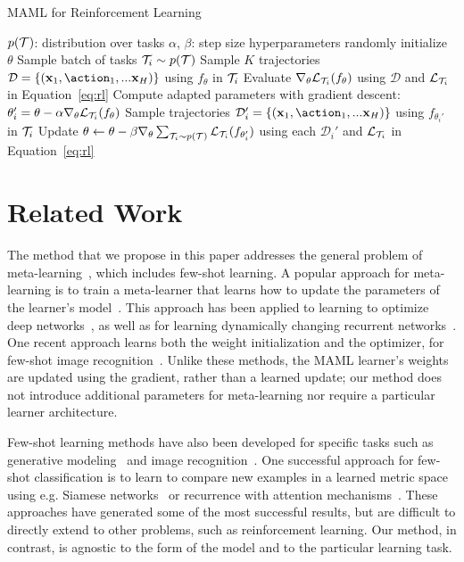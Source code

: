 \documentclass{article}
\begin{document}
\begin{algorithm}[t]
\caption{MAML for Reinforcement Learning}
\label{alg:mamlrl}
\begin{algorithmic}[1]
{\footnotesize
\REQUIRE $p(\mathcal{T})$: distribution over tasks
\REQUIRE $\alpha$, $\beta$: step size hyperparameters
\STATE randomly initialize $\theta$
\STATE Sample batch of tasks $\mathcal{T}_i \sim p(\mathcal{T})$
      \STATE Sample $K$ trajectories $\mathcal{D}=\{(\inp_1,\action_1,...\inp_H)\}$ using $f_\theta$ in $\mathcal{T}_i$
      \STATE Evaluate $\nabla_\theta \mathcal{L}_{\mathcal{T}_i}(f_\theta)$ using $\mathcal{D}$ and $\mathcal{L}_{\mathcal{T}_i}$ in Equation~\ref{eq:rl}
      \STATE Compute adapted parameters with gradient descent: $\theta_i'=\theta-\alpha \nabla_\theta  \mathcal{L}_{\mathcal{T}_i}(  f_\theta )$
      \STATE Sample trajectories $\mathcal{D}_i'=\{(\inp_1,\action_1,...\inp_H)\}$ using $f_{\theta_i'}$ in $\mathcal{T}_i$ 
 \ENDFOR
 \STATE Update $\theta \leftarrow \theta - \beta \nabla_\theta \sum_{\mathcal{T}_i \sim p(\mathcal{T})}  \mathcal{L}_{\mathcal{T}_i} ( f_{\theta_i'})$ using each $\mathcal{D}_i'$ and $\mathcal{L}_{\mathcal{T}_i}$ in Equation~\ref{eq:rl}
\ENDWHILE
}
\end{algorithmic}
\end{algorithm}


\section{Related Work}

The method that we propose in this paper addresses the general problem of meta-learning~\cite{thrun,schmidhuber1987,naik}, which includes few-shot learning.
A popular approach for meta-learning is to train a meta-learner that learns how to update the parameters of the learner's model~\cite{bengiobengio1,schmidfastweights,bengiobengio2}. This approach has been applied to learning to optimize deep networks~\cite{hochreiter,learntolearnbygdbygd,learntooptimize}, as well as for learning dynamically changing recurrent networks~\cite{hypernets}. 
One recent approach learns both the weight initialization and the optimizer, for few-shot image recognition~\cite{hugo}. Unlike these methods, the MAML learner's weights are updated using the gradient, rather than a learned update; our method does not introduce additional parameters for meta-learning nor require a particular learner architecture.

Few-shot learning methods have also been developed for specific tasks such as generative modeling~\cite{neuralstatistician,oneshotgenicml} and image recognition~\cite{matchingnets}. One successful approach for few-shot classification is to learn to compare new examples in a learned metric space using e.g. Siamese networks~\cite{siameseoneshot} or recurrence with attention mechanisms~\cite{matchingnets,comparators,prototypical}.
These approaches have generated some of the most successful results, but are difficult to directly extend to other problems, such as reinforcement learning. Our method, in contrast, is agnostic to the form of the model and to the particular learning task.
\end{document}
